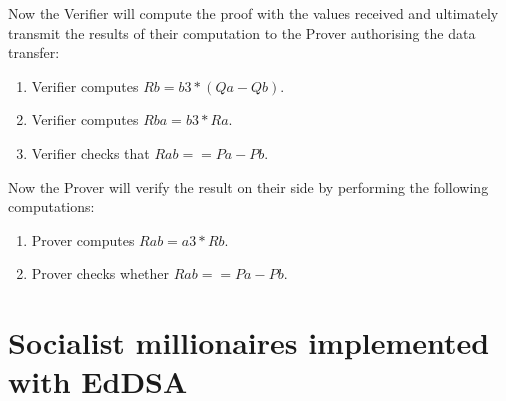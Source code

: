 Now the Verifier will compute the proof with the values received and ultimately transmit the results of their computation to the Prover authorising the data transfer:
\begin{enumerate}
    \item Verifier computes $Rb = b3 * (Qa - Qb)$.
    \item Verifier computes $Rba = b3 * Ra$.
    \item Verifier checks that $Rab == Pa - Pb$.
\end{enumerate}

Now the Prover will verify the result on their side by performing the following computations:

\begin{enumerate}
    \item Prover computes $Rab = a3 * Rb$.
    \item Prover checks whether $Rab == Pa - Pb$.
\end{enumerate}

\section*{Socialist millionaires implemented with EdDSA}

